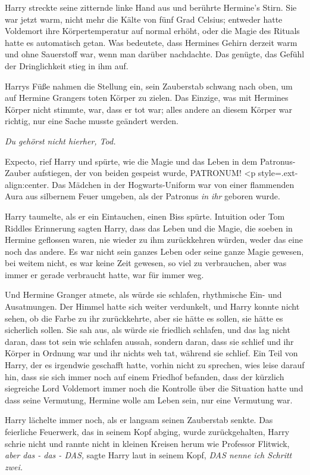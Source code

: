 Harry streckte seine zitternde linke Hand aus und berührte Hermine's Stirn. Sie
war jetzt warm, nicht mehr die Kälte von fünf Grad Celsius; entweder hatte
Voldemort ihre Körpertemperatur auf normal erhöht, oder die Magie des Rituals
hatte es automatisch getan. Was bedeutete, dass Hermines Gehirn derzeit warm und
ohne Sauerstoff war, wenn man darüber nachdachte. Das genügte, das Gefühl der
Dringlichkeit stieg in ihm auf.

Harrys Füße nahmen die Stellung ein, sein Zauberstab schwang nach oben, um auf
Hermine Grangers toten Körper zu zielen. Das Einzige, was mit Hermines Körper
nicht stimmte, war, dass er tot war; alles andere an diesem Körper war richtig,
nur eine Sache musste geändert werden.

\emph{Du gehörst nicht hierher, Tod.}

\glqq{}Expecto\grqq{}, rief Harry und spürte, wie die Magie und das Leben in dem
Patronus-Zauber aufstiegen, der von beiden gespeist wurde, \glqq{}PATRONUM!\grqq{} <p
style=\grqq{}.ext-align:center\grqq{}. Das Mädchen in der Hogwarts-Uniform war
von einer flammenden Aura aus silbernem Feuer umgeben, als der Patronus\emph{ in
ihr} geboren wurde.

Harry taumelte, als er ein Eintauchen, einen Biss spürte. Intuition oder Tom
Riddles Erinnerung sagten Harry, dass das Leben und die Magie, die soeben in
Hermine geflossen waren, nie wieder zu ihm zurückkehren würden, weder das eine
noch das andere. Es war nicht sein ganzes Leben oder seine ganze Magie gewesen,
bei weitem nicht, es war keine Zeit gewesen, so viel zu verbrauchen, aber was
immer er gerade verbraucht hatte, war für immer weg.

Und Hermine Granger atmete, als würde sie schlafen, rhythmische Ein- und
Ausatmungen. Der Himmel hatte sich weiter verdunkelt, und Harry konnte nicht
sehen, ob die Farbe zu ihr zurückkehrte, aber sie hätte es sollen, sie hätte es
sicherlich sollen. Sie sah aus, als würde sie friedlich schlafen, und das lag
nicht daran, dass tot sein wie schlafen aussah, sondern daran, dass sie schlief
und ihr Körper in Ordnung war und ihr nichts weh tat, während sie schlief. Ein
Teil von Harry, der es irgendwie geschafft hatte, vorhin nicht zu sprechen, wies
leise darauf hin, dass sie sich immer noch auf einem Friedhof befanden, dass der
kürzlich siegreiche Lord Voldemort immer noch die Kontrolle über die Situation
hatte und dass seine Vermutung, Hermine wolle am Leben sein, nur eine Vermutung
war.

Harry lächelte immer noch, als er langsam seinen Zauberstab senkte. Das
feierliche Feuerwerk, das in seinem Kopf abging, wurde zurückgehalten, Harry
schrie nicht und rannte nicht in kleinen Kreisen herum wie Professor Flitwick,
\emph{aber das - das - DAS,} sagte Harry laut in seinem Kopf,\emph{ DAS nenne
ich Schritt zwei.}

